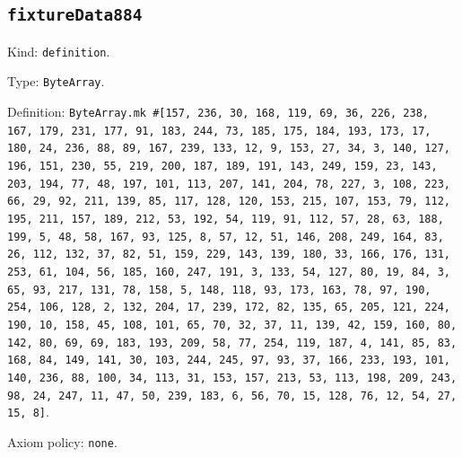 \documentclass[11pt]{article}
\begin{document}
\subsection*{\texttt{fixtureData884}}
\noindent Kind: \texttt{definition}.\par
\noindent Type: \texttt{ByteArray}.\par
\noindent Definition: \texttt{ByteArray.mk \#[157, 236, 30, 168, 119, 69, 36, 226, 238, 167, 179, 231, 177, 91, 183, 244, 73, 185, 175, 184, 193, 173, 17, 180, 24, 236, 88, 89, 167, 239, 133, 12, 9, 153, 27, 34, 3, 140, 127, 196, 151, 230, 55, 219, 200, 187, 189, 191, 143, 249, 159, 23, 143, 203, 194, 77, 48, 197, 101, 113, 207, 141, 204, 78, 227, 3, 108, 223, 66, 29, 92, 211, 139, 85, 117, 128, 120, 153, 215, 107, 153, 79, 112, 195, 211, 157, 189, 212, 53, 192, 54, 119, 91, 112, 57, 28, 63, 188, 199, 5, 48, 58, 167, 93, 125, 8, 57, 12, 51, 146, 208, 249, 164, 83, 26, 112, 132, 37, 82, 51, 159, 229, 143, 139, 180, 33, 166, 176, 131, 253, 61, 104, 56, 185, 160, 247, 191, 3, 133, 54, 127, 80, 19, 84, 3, 65, 93, 217, 131, 78, 158, 5, 148, 118, 93, 173, 163, 78, 97, 190, 254, 106, 128, 2, 132, 204, 17, 239, 172, 82, 135, 65, 205, 121, 224, 190, 10, 158, 45, 108, 101, 65, 70, 32, 37, 11, 139, 42, 159, 160, 80, 142, 80, 69, 69, 183, 193, 209, 58, 77, 254, 119, 187, 4, 141, 85, 83, 168, 84, 149, 141, 30, 103, 244, 245, 97, 93, 37, 166, 233, 193, 101, 140, 236, 88, 100, 34, 113, 31, 153, 157, 213, 53, 113, 198, 209, 243, 98, 24, 247, 11, 47, 50, 239, 183, 6, 56, 70, 15, 128, 76, 12, 54, 27, 15, 8]}.\par
\noindent Axiom policy: \texttt{none}.\par
\end{document}
